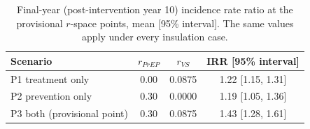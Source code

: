 \begin{table}[htbp]\centering\small
\begin{tabular}{lccc}\toprule
Scenario & $r_{PrEP}$ & $r_{VS}$ & IRR [95\% interval]\\\midrule
P1 treatment only & 0.00 & 0.0875 & 1.22 [1.15, 1.31]\\
P2 prevention only & 0.30 & 0.0000 & 1.19 [1.05, 1.36]\\
P3 both (provisional point) & 0.30 & 0.0875 & 1.43 [1.28, 1.61]\\
\bottomrule\end{tabular}\caption{Final-year (post-intervention year 10) incidence rate ratio at the provisional $r$-space points, mean [95\% interval]. The same values apply under every insulation case.}\label{tab:outcome}\end{table}
